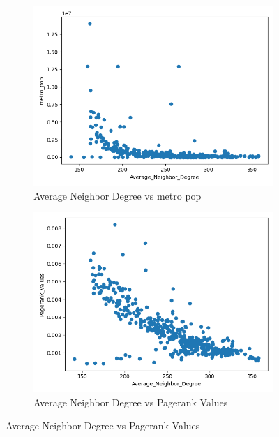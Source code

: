 \begin{figure}[H]
     \centering
     \begin{subfigure}[b]{0.3\textwidth}
         \centering
         \includegraphics[width=\textwidth]{images/comparison/ALL/relationship_Average_Neighbor_Degree_vs_metro_pop_ALL.png}
         \caption{Average Neighbor Degree vs metro pop}
     \end{subfigure}
     \hfill
     \begin{subfigure}[b]{0.3\textwidth}
         \centering
         \includegraphics[width=\textwidth]{images/comparison/ALL/relationship_Average_Neighbor_Degree_vs_Pagerank_Values_ALL.png}
         \caption{Average Neighbor Degree vs Pagerank Values}

\end{subfigure}
\end{figure}
